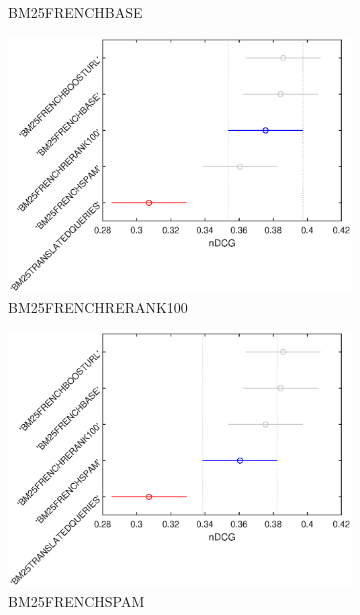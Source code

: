 \begin{figure}[p]
\begin{subfigure}[b]{0.49\textwidth}
         \caption{BM25FRENCHBASE}
         \label{fig:wthsd2}
     \end{subfigure}
     \hfill
     \begin{subfigure}[b]{0.49\textwidth}
         \centering
         \includegraphics[width=\textwidth]{figure/heldout/tukeyhsd-3.eps}
         \caption{BM25FRENCHRERANK100}
         \label{fig:wthsd3}
     \end{subfigure}
     \begin{subfigure}[b]{0.49\textwidth}
         \centering
         \includegraphics[width=\textwidth]{figure/heldout/tukeyhsd-4.eps}
         \caption{BM25FRENCHSPAM}
         \label{fig:wthsd4}
     \end{subfigure}
     \begin{subfigure}[b]{0.49\textwidth}

\end{subfigure}
\end{figure}
